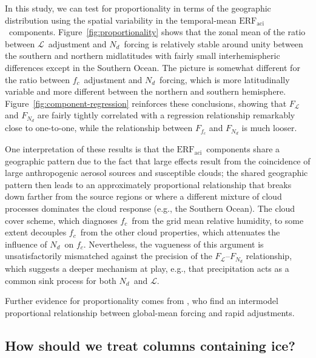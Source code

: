 \documentclass[acp, manuscript]{copernicus}\usepackage[]{graphicx}\usepackage[]{color}
\newcommand\nd{\ensuremath{N_d}}
\newcommand\cdnc{\nd}
\newcommand\lwp{\ensuremath{\mathcal L}}
\newcommand\fc{\ensuremath{f_c}}
\newcommand\cf{\fc}
\newcommand\erfaci{\ensuremath{\text{ERF}_\text{aci}}}
\begin{document}
In this study, we can test for proportionality in terms of the geographic
distribution using the spatial variability in
the temporal-mean \erfaci\ components.  Figure~\ref{fig:proportionality} shows that the zonal
mean of the ratio between \lwp\ adjustment and \nd\ forcing is relatively stable
around unity between the southern and northern midlatitudes with fairly small
interhemispheric differences except in the Southern Ocean.  The picture is
somewhat different for the ratio between \cf\ adjustment and \nd\ forcing, which
is more latitudinally variable and more different between the northern and
southern hemisphere.  Figure~\ref{fig:component-regression} reinforces these
conclusions, showing that $F_{\lwp}$ and $F_{\nd}$ are fairly tightly correlated
with a regression relationship remarkably close to one-to-one, while the
relationship between $F_{\cf}$ and $F_{\nd}$ is much looser.

One interpretation of these results is that the \erfaci\ components share a
geographic pattern due to the fact that large effects result from the
coincidence of large anthropogenic aerosol sources and susceptible clouds; the
shared geographic pattern then leads to an approximately proportional
relationship that breaks down farther from the source regions or where a
different mixture of cloud processes dominates the cloud response (e.g., the
Southern Ocean).  The cloud cover scheme, which diagnoses \cf\ from the grid
mean relative humidity, to some extent decouples \cf\ from the other cloud
properties, which attenuates the influence of \nd\ on \cf.  Nevertheless, the
vagueness of this argument is unsatisfactorily mismatched against the precision
of the $F_{\lwp}$--$F_{\nd}$ relationship, which suggests a deeper mechanism at
play, e.g., that precipitation acts as a common sink process for both \cdnc\ and
\lwp.

Further evidence for proportionality comes from \citep{Gryspeerdt2019b}, who
find an intermodel proportional relationship between global-mean forcing and
rapid adjustments.  

\subsection{How should we treat columns containing ice?}
\label{sec:ice}
\end{document}
